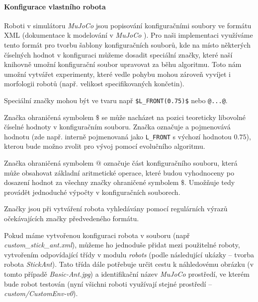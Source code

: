 \paragraph{Konfigurace vlastního robota}
Roboti v simulátoru \emph{MuJoCo} jsou popisování konfiguračními soubory ve
formátu XML (dokumentace k modelování v \emph{MuJoCo}
\citep{modeling-mujocodocumentation}). Pro naši implementaci využíváme tento
formát pro tvorbu šablony konfiguračních souborů, kde na místo některých
číselných hodnot v konfiguraci můžeme dosadit speciální značky, které naší
knihovně umožní konfigurační soubor upravovat za běhu algoritmu. Toto nám
umožní vytvářet experimenty, které vedle pohybu mohou zároveň vyvíjet i
morfologii robotů (např. velikost specifikovaných končetin). 

Speciální značky mohou být ve tvaru např \texttt{\$L\_FRONT(0.75)\$} nebo
\texttt{@...@}. 

Značka ohraničená symbolem $\$$ se může nacházet na pozici teoreticky libovolné
číselné hodnoty v konfiguračním souboru. Značka označuje a pojmenovává hodnotu
(zde např. interně pojmenovaná jako \texttt{L\_FRONT} s výchozí hodnotou
$0.75$), kterou bude možno zvolit pro vývoj pomocí evolučního algoritmu. 

Značka ohraničená symbolem $@$ označuje část konfiguračního souboru, která může
obsahovat základní aritmetické operace, které budou vyhodnoceny po dosazení
hodnot za všechny značky ohraničené symbolem $\$$. Umožňuje tedy provádět
jednoduché výpočty v konfiguračních souborech.

Značky jsou při vytváření robota vyhledávány pomocí regulárních výrazů
očekávajících značky předvedeného formátu.

Pokud máme vytvořenou konfiguraci robota v souboru (např
\emph{custom\_stick\_ant.xml}), můžeme ho jednoduše přidat mezi
použitelné roboty, vytvořením odpovídající třídy v modulu \emph{robots} (podle
následující ukázky -- tvorba robota \emph{StickAnt}). Tato třída dále potřebuje
určit cestu k náhledovému obrázku (v tomto případě \emph{Basic-Ant.jpg}) a
identifikační název \emph{MuJoCo} prostředí, ve kterém bude robot testován
(nyní všichni roboti využívají stejné prostředí -- \emph{custom/CustomEnv-v0}).


